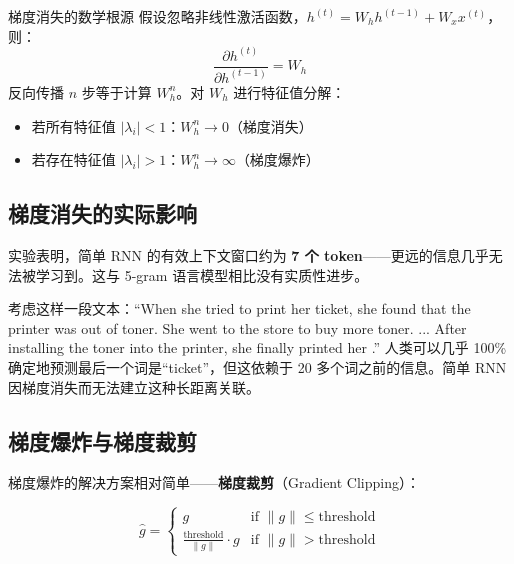 \documentclass[a4paper]{article}
\begin{document}







\begin{importantbox}{梯度消失的数学根源}
假设忽略非线性激活函数，$h^{(t)} = W_h h^{(t-1)} + W_x x^{(t)}$，则：
$$\frac{\partial h^{(t)}}{\partial h^{(t-1)}} = W_h$$
反向传播 $n$ 步等于计算 $W_h^n$。对 $W_h$ 进行特征值分解：
\begin{itemize}
    \item 若所有特征值 $|\lambda_i| < 1$：$W_h^n \to 0$（梯度消失）
    \item 若存在特征值 $|\lambda_i| > 1$：$W_h^n \to \infty$（梯度爆炸）
\end{itemize}
\end{importantbox}

\subsection{梯度消失的实际影响}

实验表明，简单 RNN 的有效上下文窗口约为 \textbf{7 个 token}——更远的信息几乎无法被学习到。这与 5-gram 语言模型相比没有实质性进步。





考虑这样一段文本：``When she tried to print her ticket, she found that the printer was out of toner. She went to the store to buy more toner. ... After installing the toner into the printer, she finally printed her \underline{\hspace{1cm}}.'' 人类可以几乎 100\% 确定地预测最后一个词是``ticket''，但这依赖于 20 多个词之前的信息。简单 RNN 因梯度消失而无法建立这种长距离关联。

\subsection{梯度爆炸与梯度裁剪}





梯度爆炸的解决方案相对简单——\textbf{梯度裁剪}（Gradient Clipping）：

$$\hat{g} = \begin{cases} g & \text{if } \|g\| \leq \text{threshold} \\ \frac{\text{threshold}}{\|g\|} \cdot g & \text{if } \|g\| > \text{threshold} \end{cases}$$
\end{document}
